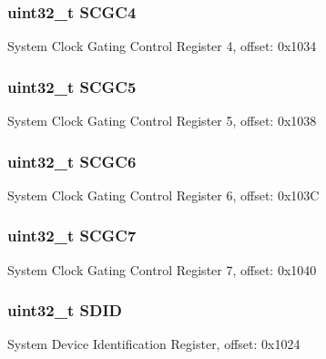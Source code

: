 \subsubsection[{S\+C\+G\+C4}]{\setlength{\rightskip}{0pt plus 5cm}uint32\+\_\+t S\+C\+G\+C4}\label{struct_s_i_m___mem_map_a10c826c9197f80b94fa050a36943e871}
System Clock Gating Control Register 4, offset\+: 0x1034 \hypertarget{struct_s_i_m___mem_map_ae622490033273b25b5ba0e17600368cd}{}
\subsubsection[{S\+C\+G\+C5}]{\setlength{\rightskip}{0pt plus 5cm}uint32\+\_\+t S\+C\+G\+C5}\label{struct_s_i_m___mem_map_ae622490033273b25b5ba0e17600368cd}
System Clock Gating Control Register 5, offset\+: 0x1038 \hypertarget{struct_s_i_m___mem_map_aee7123ada2dcba294b1f26615f2cc689}{}
\subsubsection[{S\+C\+G\+C6}]{\setlength{\rightskip}{0pt plus 5cm}uint32\+\_\+t S\+C\+G\+C6}\label{struct_s_i_m___mem_map_aee7123ada2dcba294b1f26615f2cc689}
System Clock Gating Control Register 6, offset\+: 0x103\+C \hypertarget{struct_s_i_m___mem_map_ab3ec649af457836a31a78fa8d2c4388a}{}
\subsubsection[{S\+C\+G\+C7}]{\setlength{\rightskip}{0pt plus 5cm}uint32\+\_\+t S\+C\+G\+C7}\label{struct_s_i_m___mem_map_ab3ec649af457836a31a78fa8d2c4388a}
System Clock Gating Control Register 7, offset\+: 0x1040 \hypertarget{struct_s_i_m___mem_map_a05732d81c464fe278244a2027960ddc1}{}
\subsubsection[{S\+D\+I\+D}]{\setlength{\rightskip}{0pt plus 5cm}uint32\+\_\+t S\+D\+I\+D}\label{struct_s_i_m___mem_map_a05732d81c464fe278244a2027960ddc1}
System Device Identification Register, offset\+: 0x1024 \hypertarget{struct_s_i_m___mem_map_a4aba1e2e56918ee06126ced3810264d4}{}
